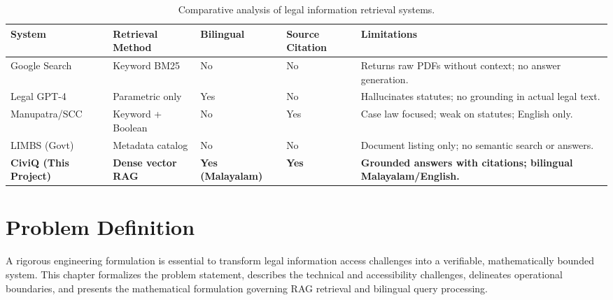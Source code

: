 \documentclass[12pt,a4paper]{report}
\begin{document}
\vspace{2pt}
\begin{table}[H]
\centering
\begin{singlespace}
\caption{Comparative analysis of legal information retrieval systems.}
\label{tab:lit_comparison}
\footnotesize
\renewcommand{\arraystretch}{1.1}
\begin{tabularx}{\textwidth}{>{\raggedright\arraybackslash}p{2.8cm} >{\centering\arraybackslash}p{1.8cm} >{\centering\arraybackslash}p{1.5cm} >{\centering\arraybackslash}p{1.8cm} >{\raggedright\arraybackslash}X}
\toprule
\textbf{System} & \textbf{Retrieval Method} & \textbf{Bilingual} & \textbf{Source Citation} & \textbf{Limitations} \\
\midrule
Google Search & Keyword BM25 & No & No & Returns raw PDFs without context; no answer generation. \\
Legal GPT-4 & Parametric only & Yes & No & Hallucinates statutes; no grounding in actual legal text. \\
Manupatra/SCC & Keyword + Boolean & No & Yes & Case law focused; weak on statutes; English only. \\
LIMBS (Govt) & Metadata catalog & No & No & Document listing only; no semantic search or answers. \\
\textbf{CiviQ (This Project)} & \textbf{Dense vector RAG} & \textbf{Yes (Malayalam)} & \textbf{Yes} & \textbf{Grounded answers with citations; bilingual Malayalam/English.} \\
\bottomrule
\end{tabularx}
\end{singlespace}
\end{table}
\vspace{-4pt}



\chapter{Problem Definition}

A rigorous engineering formulation is essential to transform legal information access challenges into a verifiable, mathematically bounded system. This chapter formalizes the problem statement, describes the technical and accessibility challenges, delineates operational boundaries, and presents the mathematical formulation governing RAG retrieval and bilingual query processing.
\end{document}
